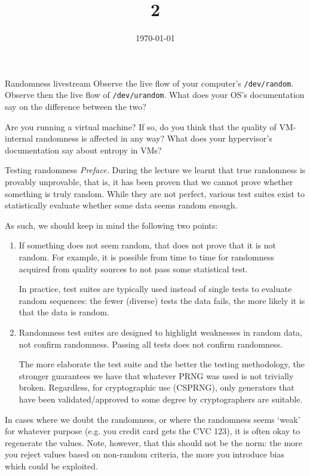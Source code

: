 \documentclass{practice}
\title{2}
\date{\today}
\begin{document}
\maketitle

\begin{task}{Randomness livestream}
  Observe the live flow of your computer's \texttt{/dev/random}.
  Observe then the live flow of \texttt{/dev/urandom}.
  What does your OS's documentation say on the difference between the two?

  Are you running a virtual machine?
  If so, do you think that the quality of VM-internal randomness is affected in any way?
  What does your hypervisor's documentation say about entropy in VMs?
\end{task}

\begin{task}{Testing randomness}
  \textit{Preface.}
  During the lecture we learnt that true randomness is provably unprovable, that is, it has been proven that we cannot prove whether something is truly random.
  While they are not perfect, various test suites exist to statistically evaluate whether some data seems random enough.

  As such, we should keep in mind the following two points:
  \begin{enumerate}
    \item If something does not seem random, that does not prove that it is not random.
    For example, it is possible from time to time for randomness acquired from quality sources to not pass some statistical test.

    In practice, test suites are typically used instead of single tests to evaluate random sequences: the fewer (diverse) tests the data fails, the more likely it is that the data is random.

    \item Randomness test suites are designed to highlight weaknesses in random data, not confirm randomness.
    Passing all tests does not confirm randomness.

    The more elaborate the test suite and the better the testing methodology, the stronger guarantees we have that whatever PRNG was used is not trivially broken.
    Regardless, for cryptographic use (CSPRNG), only generators that have been validated/approved to some degree by cryptographers are suitable.
  \end{enumerate}

  \begin{tcolorbox}[title=Note]
    In cases where we doubt the randomness, or where the randomness seems `weak' for whatever purpose (e.g. you credit card gets the CVC 123), it is often okay to regenerate the values.
    Note, however, that this should not be the norm: the more you reject values based on non-random criteria, the more you introduce bias which could be exploited.
  \end{tcolorbox}


\end{task}
\end{document}
